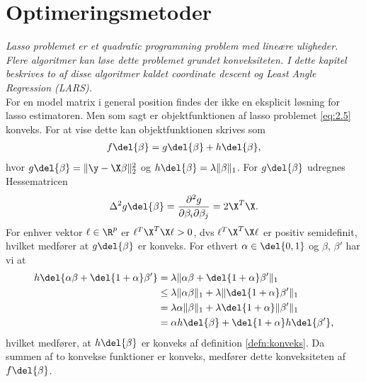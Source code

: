 \chapter{Optimeringsmetoder} \label{kap:optimeringsmetoder}
\textit{Lasso problemet er et quadratic programming problem med lineære uligheder. 
Flere algoritmer kan løse dette problemet grundet konveksiteten.  
I dette kapitel beskrives to af disse algoritmer kaldet coordinate descent og Least Angle Regression (LARS).} \\[4mm]
%
For en model matrix i general position findes der ikke en eksplicit løsning for lasso estimatoren.
Men som sagt er objektfunktionen af lasso problemet \eqref{eq:2.5} konveks.
For at vise dette kan objektfunktionen skrives som
\begin{align*}
f \del{\beta} = g \del{\beta} + h \del{\beta},
\end{align*}
hvor \(g \del{\beta} = \Vert \y - \X \beta \Vert_2^2\) og \(h \del{\beta} = \lambda \Vert \beta \Vert_1\).
For \(g \del{\beta}\) udregnes Hessematricen
\begin{align*}
\Delta^2 g \del{\beta} = \frac{\partial^2 g }{\partial \beta_i \partial \beta_j} = 2 \X^T \X.
\end{align*}
For enhver vektor \(\ell \in \R^p\) er \(\ell^T \X^T \X \ell > 0\), dvs \(\ell^T \X^T \X \ell \) er positiv semidefinit, hvilket medfører at \(g \del{\beta}\) er konveks.
For ethvert \(\alpha \in \del{0,1}\) og \(\beta\), \(\beta'\) har vi at
\begin{align*}
h \del{\alpha \beta + \del{1+\alpha}\beta'} &= \lambda \Vert \alpha \beta + \del{1+\alpha} \beta' \Vert_1 \\
&\leq \lambda \Vert \alpha \beta \Vert_1 + \lambda \Vert \del{1+\alpha} \beta' \Vert_1 \\
&= \lambda \alpha \Vert \beta \Vert_1 + \lambda \del{1+\alpha} \Vert \beta' \Vert_1 \\
&= \alpha h \del{\beta} + \del{1+\alpha} h \del{\beta'},
\end{align*}
hvilket medfører, at \(h \del{\beta}\) er konveks af definition \ref{defn:konveks}.
Da summen af to konvekse funktioner er konveks, medfører dette konveksiteten af \(f \del{\beta}\). 






